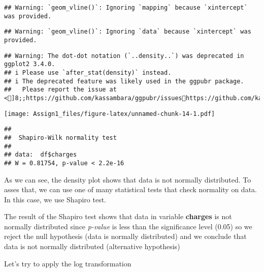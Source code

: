 \documentclass[
]{article}
\newenvironment{Shaded}{\begin{snugshade}}{\end{snugshade}}
\newcommand{\AttributeTok}[1]{\textcolor[rgb]{0.77,0.63,0.00}{#1}}
\newcommand{\CommentTok}[1]{\textcolor[rgb]{0.56,0.35,0.01}{\textit{#1}}}
\newcommand{\FunctionTok}[1]{\textcolor[rgb]{0.00,0.00,0.00}{#1}}
\newcommand{\NormalTok}[1]{#1}
\newcommand{\SpecialCharTok}[1]{\textcolor[rgb]{0.00,0.00,0.00}{#1}}
\newcommand{\StringTok}[1]{\textcolor[rgb]{0.31,0.60,0.02}{#1}}
\begin{document}
\begin{verbatim}
## Warning: `geom_vline()`: Ignoring `mapping` because `xintercept` was provided.
\end{verbatim}

\begin{verbatim}
## Warning: `geom_vline()`: Ignoring `data` because `xintercept` was provided.
\end{verbatim}

\begin{verbatim}
## Warning: The dot-dot notation (`..density..`) was deprecated in ggplot2 3.4.0.
## i Please use `after_stat(density)` instead.
## i The deprecated feature was likely used in the ggpubr package.
##   Please report the issue at <]8;;https://github.com/kassambara/ggpubr/issueshttps://github.com/kassambara/ggpubr/issues]8;;>.
\end{verbatim}

\texttt{[image: Assign1\_files/figure-latex/unnamed-chunk-14-1.pdf]}

\begin{Shaded}
\end{Shaded}

\begin{verbatim}
## 
##  Shapiro-Wilk normality test
## 
## data:  df$charges
## W = 0.81754, p-value < 2.2e-16
\end{verbatim}

As we can see, the density plot shows that data is not normally
distributed. To asses that, we can use one of many statistical tests
that check normality on data. In this case, we use Shapiro test.

The result of the Shapiro test shows that data in variable
\textbf{charges} is not normally distributed since \emph{p-value} is
less than the significance level (0.05) so we reject the null hypothesis
(data is normally distributed) and we conclude that data is not normally
distributed (alternative hypothesis)

Let's try to apply the log transformation

\begin{Shaded}
\end{Shaded}
\end{document}
